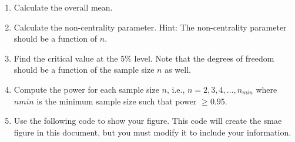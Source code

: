 \documentclass{article}
\begin{document}
\begin{enumerate}
	\item Calculate the overall mean.
	\item Calculate the non-centrality parameter. Hint: The non-centrality parameter
	      should be a function of $n$.
	\item Find the critical value at the $5\%$ level. Note that the degrees of freedom should be a function of the
	      sample size $n$ as well.
	\item Compute the power for each sample size $n$, i.e., $n=2,3,4,\ldots,n_{min}$
	      where $n{min}$ is the minimum sample size such that power $\ge 0.95$.
	\item Use the following code to show your figure. This code will create the smae figure in this document, but you
	      must modify it to include your information.
\end{enumerate}

\begin{rbox}
	\inputminted{r}{code/prob6.R}
\end{rbox}

\end{document}
